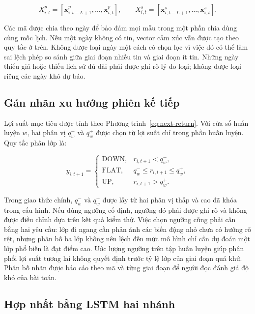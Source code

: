 \begin{equation}
  X^{p}_{i,t}=[\mathbf{x}^{p}_{i,t-L+1},\ldots,\mathbf{x}^{p}_{i,t}],
  \qquad
  X^{s}_{i,t}=[\mathbf{x}^{s}_{i,t-L+1},\ldots,\mathbf{x}^{s}_{i,t}].
  \label{eq:input-windows}
\end{equation}

Các mã được chia theo ngày để bảo đảm mọi mẫu trong một phần chia dùng cùng mốc lịch.
Nếu một ngày không có tin, vector cảm xúc vẫn được tạo theo quy tắc ở trên. Không
được loại ngày một cách có chọn lọc vì việc đó có thể làm sai lệch phép so sánh giữa
giai đoạn nhiều tin và giai đoạn ít tin. Những ngày thiếu giá hoặc thiếu lịch sử đủ
dài phải được ghi rõ lý do loại; không được loại riêng các ngày khó dự báo.

\subsection{Gán nhãn xu hướng phiên kế tiếp}

Lợi suất mục tiêu được tính theo Phương trình~\ref{eq:next-return}. Với cửa sổ huấn
luyện $w$, hai phân vị $q^-_w$ và $q^+_w$ được chọn từ lợi suất chỉ trong phần huấn
luyện. Quy tắc phân lớp là:

\begin{equation}
 y_{i,t+1}=\begin{cases}
 \mathrm{DOWN}, & r_{i,t+1}<q^-_w,\\
 \mathrm{FLAT}, & q^-_w\leq r_{i,t+1}\leq q^+_w,\\
 \mathrm{UP}, & r_{i,t+1}>q^+_w.
 \end{cases}
 \label{eq:trend-label}
\end{equation}

Trong giao thức chính, $q^-_w$ và $q^+_w$ được lấy từ hai phân vị thấp và cao đã khóa
trong cấu hình. Nếu dùng ngưỡng cố định, ngưỡng đó phải được ghi rõ và không được
điều chỉnh dựa trên kết quả kiểm thử. Việc chọn ngưỡng cũng phải cân bằng hai yêu
cầu: lớp đi ngang cần phản ánh các biến động nhỏ chưa có hướng rõ rệt, nhưng phân bố
ba lớp không nên lệch đến mức mô hình chỉ cần dự đoán một lớp phổ biến là đạt điểm
cao. Ước lượng ngưỡng trên tập huấn luyện giúp phân phối lợi suất tương lai không
quyết định trước tỷ lệ lớp của giai đoạn quá khứ. Phân bố nhãn được báo cáo theo mã
và từng giai đoạn để người đọc đánh giá độ khó của bài toán.

\subsection{Hợp nhất bằng LSTM hai nhánh}

